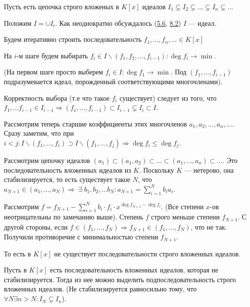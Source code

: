 \documentclass[../main.tex]{subfiles}
\begin{document}
    Пусть есть цепочка строго вложеных в $K[x]$ идеалов
    $I_1 \subsetneq I_2 \subsetneq \ldots  \subsetneq I_n \subsetneq \ldots$

    Положим $I = \cup I_i$. Как неоднократно обсуждалось (\hyperlink{5.6}{5.6},
    \hyperlink{8.2}{8.2}) $I$ --- идеал.

    Будем итеративно строить последовательность
    $f_1, \ldots, f_n, \ldots \in K[x]$

    На $i$-м шаге будем выбирать
    $f_i \in I \backslash (f_1, f_2, \ldots, f_{i - 1}): \deg f_i \to \min$.

    (На первом шаге просто выберем $f_i \in I: \deg f_1 \to \min$.
    Под $(f_1, \ldots, f_{i - 1})$ подразумевается идеал, порожденный
    соответствующими многочленами).

    Корректность выбора (т.е что такое $f_i$ существует) следует из того, что
    $f_1, \ldots f_{i - 1} \in
    I_{i - 1} \Rightarrow (f_1, \ldots, f_{i - 1}) \subset I_{i - 1}
    \subsetneq I_i \subset I$.

    Рассмотрим теперь старшие коэффициенты этих многочленов
    $a_1, a_2, \ldots, a_n, \ldots$. Сразу заметим, что при $i < j:
    I \backslash (f_1, \ldots, f_i) \supset I \backslash (f_1, \ldots, f_j)
    \Rightarrow \deg f_i \leqslant \deg f_j$.

    Рассмотрим цепочку идеалов $(a_1) \subset (a_1, a_2) \subset \ldots
    \subset (a_1, \ldots, a_n) \subset \ldots $. Это последовательность
    вложенных идеалов из $K$. Поскольку $K$ --- нетерово, она стабилизируется,
    то есть существует такое $N$, что $a_{N + 1} \in (a_1, \ldots, a_N)
    \Rightarrow \; \exists \; b_1, b_2, \ldots b_N: a_{N + 1}
    = \sum\limits_{i = 1}^N b_i a_i$.

    Рассмотрим $f = f_{N + 1} - \sum\limits_{i = 1}^N b_i \cdot f_i \cdot
    x^{\deg f_{N + 1} - \deg f_i}$. (Все степени $x$-ов неотрицательны
    по замечанию выше). Степень $f$ строго меньше степени $f_{N + 1}$. С другой
    стороны, если $f \in (f_1, \ldots, f_N) \Rightarrow f_{N + 1} \in
    (f_1, \ldots, f_N)$, что не так. Получили противоречие с минимальностью
    степени $f_{N + 1}$.

    То есть в $K[x]$ не существует последовательности строго вложенных идеалов.

    Пусть в $K[x]$ есть последовательность вложенных идеалов, которая
    не стабилизируется. Тогда из нее можно выделить подпоследовательность
    строго вложенных идеалов. (Не стабилизируется равносильно тому, что
    $\forall N \exists n > N: I_N \subsetneq I_n$).
\end{document}
